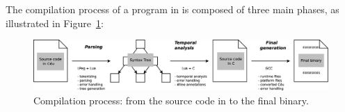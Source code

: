 %

The compilation process of a program in \CEU is composed of three main phases, 
as illustrated in Figure~\ref{fig.impl}:

\begin{figure}[ht]
\centering
\includegraphics[scale=0.20]{impl}
\caption{ Compilation process: from the source code in \CEU to the final 
binary.
\label{fig.impl}
}
\end{figure}

